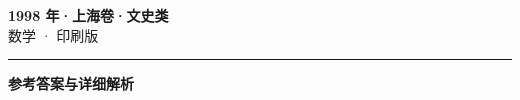 \documentclass[zihao=5, a4paper]{ctexart}
\begin{document}
\begin{center}
  {\Large\bfseries 1998 年·上海卷·文史类}\\[4pt]
  {\large 数学 · 印刷版}
\end{center}
\medskip
{}

\par\bigskip\hrule\bigskip
{}
\begin{center}{\large\bfseries 参考答案与详细解析}\end{center}
\smallskip

\end{document}
